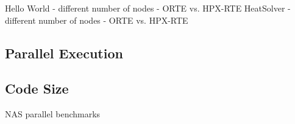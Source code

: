 Hello World - different number of nodes - ORTE vs. HPX-RTE
HeatSolver - different number of nodes - ORTE vs. HPX-RTE



\subsection{Parallel Execution}

\subsection{Code Size}

NAS parallel benchmarks~\cite{bailey1991parallel}
